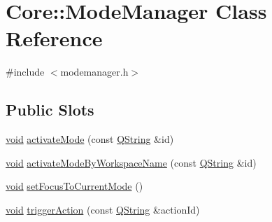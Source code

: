 \hypertarget{class_core_1_1_mode_manager}{\section{\-Core\-:\-:\-Mode\-Manager \-Class \-Reference}
\label{class_core_1_1_mode_manager}
}


{\ttfamily \#include $<$modemanager.\-h$>$}

\subsection*{\-Public \-Slots}
\begin{DoxyCompactItemize}
\item 
\hyperlink{group___u_a_v_objects_plugin_ga444cf2ff3f0ecbe028adce838d373f5c}{void} \hyperlink{group___core_plugin_ga9f75e14a1a348f3f46c62b4575dbca9e}{activate\-Mode} (const \hyperlink{group___u_a_v_objects_plugin_gab9d252f49c333c94a72f97ce3105a32d}{\-Q\-String} \&id)
\item 
\hyperlink{group___u_a_v_objects_plugin_ga444cf2ff3f0ecbe028adce838d373f5c}{void} \hyperlink{group___core_plugin_gadd4b3b24c51d0993e61aab8ee9e76f48}{activate\-Mode\-By\-Workspace\-Name} (const \hyperlink{group___u_a_v_objects_plugin_gab9d252f49c333c94a72f97ce3105a32d}{\-Q\-String} \&id)
\item 
\hyperlink{group___u_a_v_objects_plugin_ga444cf2ff3f0ecbe028adce838d373f5c}{void} \hyperlink{group___core_plugin_gab1fd02bc6554c6df4acfad271551230d}{set\-Focus\-To\-Current\-Mode} ()
\item 
\hyperlink{group___u_a_v_objects_plugin_ga444cf2ff3f0ecbe028adce838d373f5c}{void} \hyperlink{group___core_plugin_gad031a62ca8a27a4a5fb24c7bb77fbeb5}{trigger\-Action} (const \hyperlink{group___u_a_v_objects_plugin_gab9d252f49c333c94a72f97ce3105a32d}{\-Q\-String} \&action\-Id)
\end{DoxyCompactItemize}
